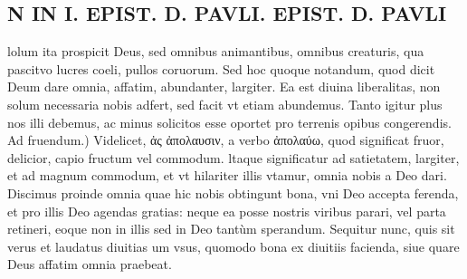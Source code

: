 \documentclass{article}
\begin{document}
\begin{pages}
\section*{N IN I. EPIST. D. PAVLI. EPIST. D. PAVLI }
\marginpar{[ p.132 ]}\pstart lolum ita prospicit Deus, sed omnibus animantibus, omnibus creaturis, qua pascitvo lucres coeli, pullos coruorum. Sed hoc quoque notandum, quod dicit Deum dare omnia, affatim, abundanter, largiter. Ea est diuina liberalitas, non solum necessaria nobis adfert, sed facit vt etiam abundemus. Tanto igitur plus nos illi debemus, ac minus solicitos esse oportet pro terrenis opibus congerendis.  \pend\pstart Ad fruendum.) Videlicet, ἀς ἀπολαυσιν, a verbo ἀπολαύω, quod significat fruor, delicior, capio fructum vel commodum. ltaque significatur ad satietatem, largiter, et ad magnum commodum, et vt hilariter illis vtamur, omnia nobis a Deo dari. Discimus proinde omnia quae hic nobis obtingunt bona, vni Deo accepta ferenda, et pro illis Deo agendas gratias: neque ea posse nostris viribus parari, vel parta retineri, eoque non in illis sed in Deo tantùm sperandum. Sequitur nunc, quis sit verus et laudatus diuitias um vsus, quomodo bona ex diuitiis facienda, siue quare Deus affatim omnia praebeat.  \pend
{}
{}

\end{pages}
\end{document}
